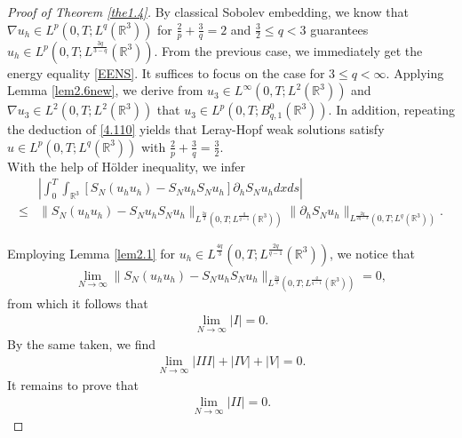 \documentclass[11pt]{article}
\theoremstyle{plain}\newtheorem{definition}{Definition}[section]
\theoremstyle{definition}\newtheorem{theorem}{Theorem}[section]
\theoremstyle{plain}\newtheorem{lemma}[theorem]{Lemma}
\theoremstyle{plain}\newtheorem{coro}[theorem]{Corollary}
\theoremstyle{plain}\newtheorem{prop}[theorem]{Proposition}
\theoremstyle{remark}\newtheorem{remark}{Remark}[section]
\newcommand{\be}{\begin{equation}}
\newcommand{\ee}{\end{equation}}
\newcommand{\ba}{\begin{aligned}}
\newcommand{\ea}{\end{aligned}}
\newcommand{\f}{\frac}
\numberwithin{equation}{section}
\begin{document}
\begin{proof}[Proof of Theorem \ref{the1.4}]
By classical  Sobolev embedding, we know that $\nabla u_{h}\in L^{p }(0,T;L^{q }(\mathbb{R}^{3}))$ for $\f{2}{p }+\f{3}{q }=2$ and $\f32\leq q < 3$ guarantees
$u_{h}\in L^{p }(0,T;L^{\f{3q}{3-q} }(\mathbb{R}^{3}))$. From the previous case, we immediately  get the energy equality \eqref{EENS}. It suffices to focus on the case for $3\leq q < \infty.$
Applying Lemma \ref{lem2.6new}, we derive from $u_{3}\in L^{\infty}(0,T;L^{2}(\mathbb{R}^{3}))  $  and $\nabla u_{3}\in L^{2}(0,T;L^{2}(\mathbb{R}^{3}))  $ that
$u_{3}\in L^{p}(0,T;B^{0}_{q,1}(\mathbb{R}^{3})).$
In addition, repeating the deduction of \eqref{4.110}   yields that Leray-Hopf weak solutions satisfy
$u \in L^{p}(0,T; L^{q}(\mathbb{R}^{3}))   $ with $\f{2}{p}+\f{3}{q}=\f32.$\\
With the help of H\"older inequality, we infer
\be\ba
&\left|\int_{0}^{T}\int_{\mathbb{R}^{3}} [S_{N}(u_{h}u_{h} )-S_{N} u_{h}S_{N}u_{h} ]\partial_{h} S_{N}u_{h} dxds\right| \\
\leq& \|S_{N}(u_{h}u_{h} )-S_{N} u_{h}S_{N}u_{h} \|_{ L^{\f{2q }{3}}(0,T;L^{\f{ q}{q-1}} (\mathbb{R}^{3}))} \|\partial_{h} S_{N}u_{h}\|_{L^{\f{2q}{2q-3}}(0,T;L^{q}  (\mathbb{R}^{3}))}.
\ea\ee

Employing Lemma \ref{lem2.1} for $u_{h}\in L^{\f{4q }{3}}(0,T;L^{\f{ 2q}{q-1}} (\mathbb{R}^{3}))$, we notice that
\be\ba \lim_{N\rightarrow\infty}\|S_{N}(u_{h}u_{h} )-S_{N} u_{h}S_{N}u_{h} \|_{ L^{\f{2q }{3}}(0,T;L^{\f{ q}{q-1}} (\mathbb{R}^{3}))}=0,
\ea\ee
from which it follows that
\be\ba
 \lim_{N\rightarrow\infty}|I|=0.
\ea\ee
By the same taken, we find
\be\ba
 \lim_{N\rightarrow\infty}|III|+|IV|+|V|=0.
\ea\ee
It remains to prove that
\be\ba\label{4.190}
 \lim_{N\rightarrow\infty}|II |=0.
\ea\ee




\end{proof}
\end{document}
